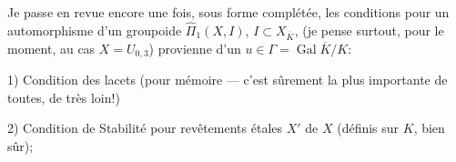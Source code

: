 Je passe en revue encore une fois, sous forme complétée, les conditions pour un automorphisme \inserted{$\Theta$} d'un groupoide $\widehat{\Pi}_1(X,I)$, $I\subset X_{\overline{K}}$,  (je pense surtout, pour le moment, au cas $X=U_{0,3}$) provienne d'un $u\in\Gamma=\operatorname{Gal}\overline{K}/K$:

1) Condition des lacets (pour mémoire --- c'est sûrement la plus importante de toutes, de très loin!)

2) Condition de Stabilité pour revêtements étales  $X'$ de $X$ (définis sur $K$, bien sûr);
